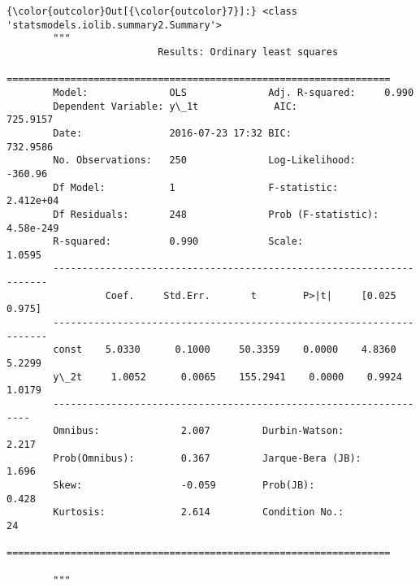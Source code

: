\documentclass{article}
\begin{document}
            \begin{Verbatim}[commandchars=\\\{\}]
{\color{outcolor}Out[{\color{outcolor}7}]:} <class 'statsmodels.iolib.summary2.Summary'>
        """
                          Results: Ordinary least squares
        ==================================================================
        Model:              OLS              Adj. R-squared:     0.990    
        Dependent Variable: y\_1t             AIC:                725.9157 
        Date:               2016-07-23 17:32 BIC:                732.9586 
        No. Observations:   250              Log-Likelihood:     -360.96  
        Df Model:           1                F-statistic:        2.412e+04
        Df Residuals:       248              Prob (F-statistic): 4.58e-249
        R-squared:          0.990            Scale:              1.0595   
        ---------------------------------------------------------------------
                 Coef.     Std.Err.       t        P>|t|     [0.025    0.975]
        ---------------------------------------------------------------------
        const    5.0330      0.1000     50.3359    0.0000    4.8360    5.2299
        y\_2t     1.0052      0.0065    155.2941    0.0000    0.9924    1.0179
        ------------------------------------------------------------------
        Omnibus:              2.007         Durbin-Watson:           2.217
        Prob(Omnibus):        0.367         Jarque-Bera (JB):        1.696
        Skew:                 -0.059        Prob(JB):                0.428
        Kurtosis:             2.614         Condition No.:           24   
        ==================================================================
        
        """
\end{Verbatim}
        
\end{document}
